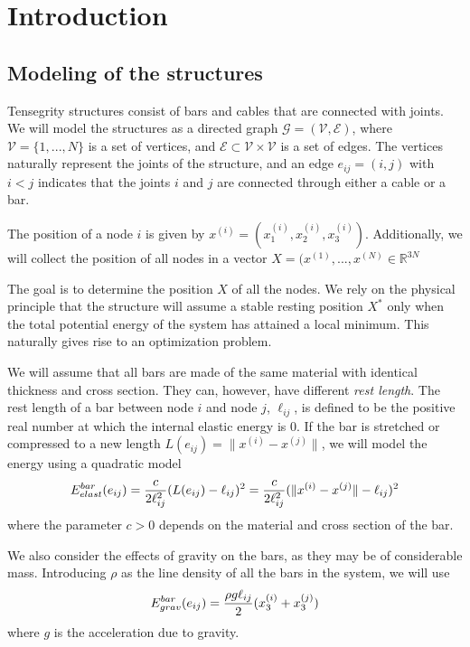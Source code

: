 \section{Introduction}
\subsection{Modeling of the structures}
Tensegrity structures consist of bars and cables that are connected with joints. We will model the structures as a directed graph $\mathcal{G} = (\mathcal{V},\mathcal{E})$, where $\mathcal{V} = \{1,...,N\}$ is a set of vertices, and $\mathcal{E} \subset \mathcal{V} \times \mathcal{V}$ is a set of edges. The vertices naturally represent the joints of the structure, and an edge $e_{ij} = (i,j)$ with $i < j$ indicates that the joints $i$ and $j$ are connected through either a cable or a bar.

The position of a node $i$ is given by $x^{(i)} = (x_1^{(i)},x_2^{(i)},x_3^{(i)})$. Additionally, we will collect the position of all nodes in a vector $X = (x^{(1)},...,x^{(N)} \in \mathbb{R}^{3N}$

The goal is to determine the position $X$ of all the nodes. We rely on the physical principle that the structure will assume a stable resting position $X^*$ only when the total potential energy of the system has attained a local minimum. This naturally gives rise to an optimization problem.

We will assume that all bars are made of the same material with identical thickness and cross section. They can, however, have different \emph{rest length}. The rest length of a bar between node $i$ and node $j$, $\ell_{ij}$, is defined to be the positive real number at which the internal elastic energy is $0$. If the bar is stretched or compressed to a new length $L(e_{ij})=\lVert x^{(i)} - x^{(j)}\rVert$, we will model the energy using a quadratic model
\begin{equation}
    E^{bar}_{elast}(e_{ij}) = \frac{c}{2\ell_{ij}^2}(L(e_{ij}) - \ell_{ij})^2 = \frac{c}{2 \ell_{ij}^2}(\lVert x^{(i)} - x^{(j)}\rVert - \ell_{ij})^2
    \label{barElast}
\end{equation}
where the parameter $c > 0$ depends on the material and cross section of the bar. 

We also consider the effects of gravity on the bars, as they may be of considerable mass. Introducing $\rho$ as the line density of all the bars in the system, we will use
\begin{equation}
    E^{bar}_{grav}(e_{ij}) = \frac{\rho g \ell_{ij}}{2}(x_3^{(i)}+x_3^{(j)})
    \label{barGrav}
\end{equation}
where $g$ is the acceleration due to gravity.

